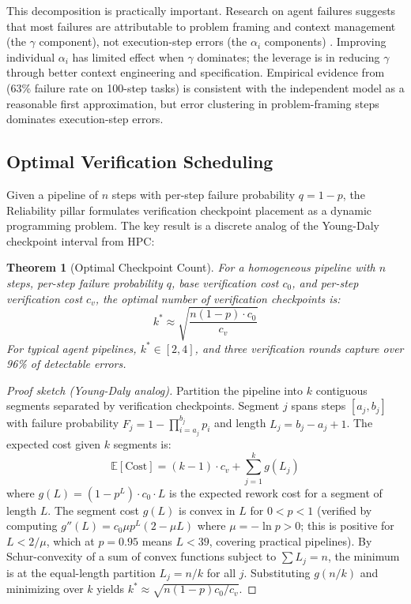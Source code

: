 \documentclass[11pt, a4paper]{googledeepmind}
\newtheorem{theorem}{Theorem}[section]
\begin{document}
This decomposition is practically important. Research on agent failures suggests that most failures are attributable to problem framing and context management (the $\gamma$ component), not execution-step errors (the $\alpha_i$ components) \citep{cemri2025multiagent}. Improving individual $\alpha_i$ has limited effect when $\gamma$ dominates; the leverage is in reducing $\gamma$ through better context engineering and specification. Empirical evidence from \citet{hariharan2025plan} (63\% failure rate on 100-step tasks) is consistent with the independent model as a reasonable first approximation, but error clustering in problem-framing steps dominates execution-step errors.

\subsection{Optimal Verification Scheduling}

Given a pipeline of $n$ steps with per-step failure probability $q = 1 - p$, the Reliability pillar formulates verification checkpoint placement as a dynamic programming problem. The key result is a discrete analog of the Young-Daly checkpoint interval from HPC:

\begin{theorem}[Optimal Checkpoint Count]
\label{thm:checkpoint}
For a homogeneous pipeline with $n$ steps, per-step failure probability $q$, base verification cost $c_0$, and per-step verification cost $c_v$, the optimal number of verification checkpoints is:
\begin{equation}
    k^* \approx \sqrt{\frac{n(1-p) \cdot c_0}{c_v}}
\end{equation}
For typical agent pipelines, $k^* \in [2, 4]$, and three verification rounds capture over 96\% of detectable errors.
\end{theorem}

\begin{proof}[Proof sketch (Young-Daly analog)]
Partition the pipeline into $k$ contiguous segments separated by verification checkpoints. Segment $j$ spans steps $[a_j, b_j]$ with failure probability $F_j = 1 - \prod_{i=a_j}^{b_j} p_i$ and length $L_j = b_j - a_j + 1$. The expected cost given $k$ segments is:
\[
    \mathbb{E}[\text{Cost}] = (k-1) \cdot c_v + \sum_{j=1}^{k} g(L_j)
\]
where $g(L) = (1 - p^L) \cdot c_0 \cdot L$ is the expected rework cost for a segment of length $L$. The segment cost $g(L)$ is convex in $L$ for $0 < p < 1$ (verified by computing $g''(L) = c_0 \mu p^L(2 - \mu L)$ where $\mu = -\ln p > 0$; this is positive for $L < 2/\mu$, which at $p = 0.95$ means $L < 39$, covering practical pipelines). By Schur-convexity of a sum of convex functions subject to $\sum L_j = n$, the minimum is at the equal-length partition $L_j = n/k$ for all $j$. Substituting $g(n/k)$ and minimizing over $k$ yields $k^* \approx \sqrt{n(1-p)c_0/c_v}$.
\end{proof}
\end{document}
